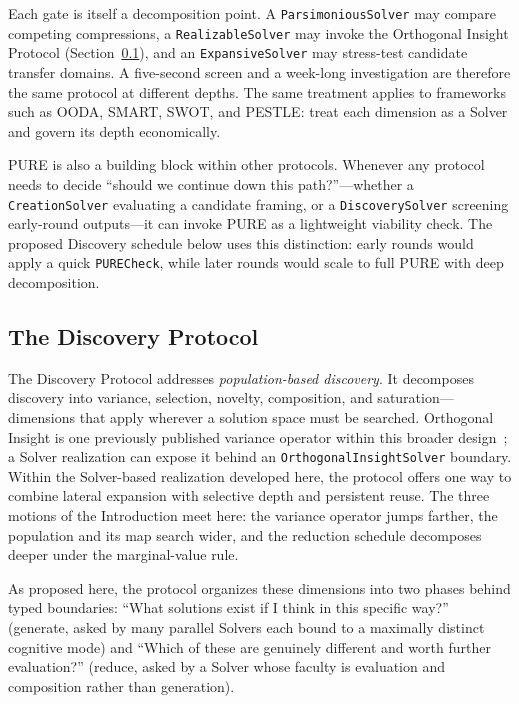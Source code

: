 \documentclass[11pt]{article}
\let\oldtexttt\texttt
\renewcommand{\texttt}[1]{\oldtexttt{\small #1}}
\begin{document}
Each gate is itself a decomposition point. A \texttt{ParsimoniousSolver} may compare competing compressions, a \texttt{RealizableSolver} may invoke the Orthogonal Insight Protocol (Section~\ref{sec:genreduce}), and an \texttt{ExpansiveSolver} may stress-test candidate transfer domains. A five-second screen and a week-long investigation are therefore the same protocol at different depths. The same treatment applies to frameworks such as OODA, SMART, SWOT, and PESTLE: treat each dimension as a Solver and govern its depth economically.

PURE is also a building block within other protocols. Whenever any protocol needs to decide ``should we continue down this path?''---whether a \texttt{CreationSolver} evaluating a candidate framing, or a \texttt{DiscoverySolver} screening early-round outputs---it can invoke PURE as a lightweight viability check. The proposed Discovery schedule below uses this distinction: early rounds would apply a quick \texttt{PURECheck}, while later rounds would scale to full PURE with deep decomposition.

\subsection{The Discovery Protocol}
\label{sec:genreduce}

The Discovery Protocol addresses \emph{population-based discovery}. It decomposes discovery into variance, selection, novelty, composition, and saturation---dimensions that apply wherever a solution space must be searched. Orthogonal Insight is one previously published variance operator within this broader design~\cite{westerberg2025strangeworlds}; a Solver realization can expose it behind an \texttt{OrthogonalInsightSolver} boundary. Within the Solver-based realization developed here, the protocol offers one way to combine lateral expansion with selective depth and persistent reuse. The three motions of the Introduction meet here: the variance operator jumps farther, the population and its map search wider, and the reduction schedule decomposes deeper under the marginal-value rule.

As proposed here, the protocol organizes these dimensions into two phases behind typed boundaries: ``What solutions exist if I think in this specific way?'' (generate, asked by many parallel Solvers each bound to a maximally distinct cognitive mode) and ``Which of these are genuinely different and worth further evaluation?'' (reduce, asked by a Solver whose faculty is evaluation and composition rather than generation).
\end{document}
